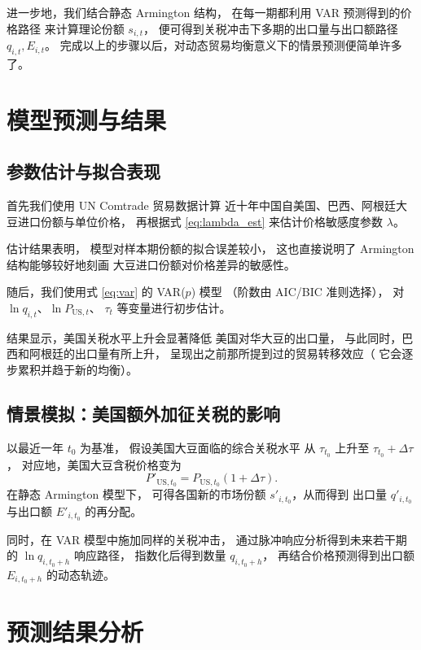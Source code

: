 \documentclass[12pt,a4paper]{ctexart} %
\begin{document}
进一步地，我们结合静态 Armington 结构，
在每一期都利用 VAR 预测得到的价格路径
来计算理论份额 $s_{i,t}$，
便可得到关税冲击下多期的出口量与出口额路径
$q_{i,t}, E_{i,t}$。
完成以上的步骤以后，对动态贸易均衡意义下的情景预测便简单许多了。

\section{模型预测与结果}

\subsection{参数估计与拟合表现}

首先我们使用 UN Comtrade 贸易数据计算
近十年中国自美国、巴西、阿根廷大豆进口份额与单位价格，
再根据式 \eqref{eq:lambda_est} 来估计价格敏感度参数 $\lambda$。

估计结果表明，
模型对样本期份额的拟合误差较小，
这也直接说明了 Armington 结构能够较好地刻画
大豆进口份额对价格差异的敏感性。

随后，我们使用式 \eqref{eq:var} 的 VAR($p$) 模型
（阶数由 AIC/BIC 准则选择），
对 $\ln q_{i,t}$、$\ln P_{\mathrm{US},t}$、
$\tau_t$ 等变量进行初步估计。

结果显示，美国关税水平上升会显著降低
美国对华大豆的出口量，
与此同时，巴西和阿根廷的出口量有所上升，
呈现出之前那所提到过的贸易转移效应（
它会逐步累积并趋于新的均衡）。

\subsection{情景模拟：美国额外加征关税的影响}

以最近一年 $t_0$ 为基准，
假设美国大豆面临的综合关税水平
从 $\tau_{t_0}$ 上升至 $\tau_{t_0}+\Delta\tau$，
对应地，美国大豆含税价格变为
\begin{equation}
  P'_{\mathrm{US},t_0} = P_{\mathrm{US},t_0}(1+\Delta\tau) .
\end{equation}
在静态 Armington 模型下，
可得各国新的市场份额 $s'_{i,t_0}$，从而得到
出口量 $q'_{i,t_0}$ 与出口额 $E'_{i,t_0}$ 的再分配。

同时，在 VAR 模型中施加同样的关税冲击，
通过脉冲响应分析得到未来若干期的
$\ln q_{i,t_0+h}$ 响应路径，
指数化后得到数量 $q_{i,t_0+h}$，
再结合价格预测得到出口额 $E_{i,t_0+h}$ 的动态轨迹。

\section{预测结果分析}
\end{document}
